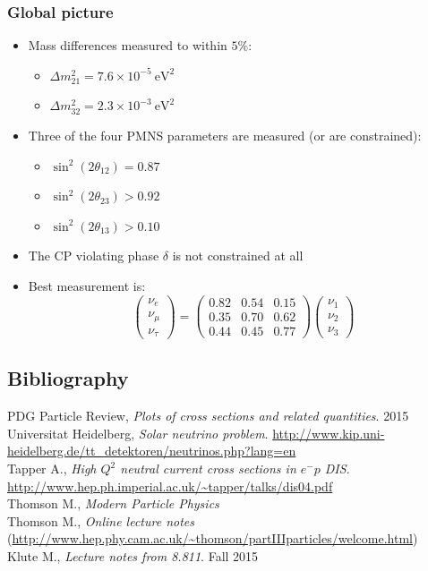 \documentclass[11pt]{article}
\newcommand{\ev}{\text{eV}}
\newcommand{\el}{\ensuremath{e^{-}}}
\newcommand{\bibspace}{\vspace{5mm}\\\noindent}
\begin{document}
\subsubsection{Global picture}
\begin{itemize}
  \item Mass differences measured to within $5\%$:
  \begin{itemize}
    \item $\Delta m_{21}^2 = 7.6 \times 10^{-5}~\ev^2$
    \item $\Delta m_{32}^2 = 2.3 \times 10^{-3}~\ev^2$
  \end{itemize}
  \item Three of the four PMNS parameters are measured (or are constrained):
  \begin{itemize}
    \item $\sin^2(2\theta_{12}) = 0.87$
    \item $\sin^2(2\theta_{23}) > 0.92$
    \item $\sin^2(2\theta_{13}) > 0.10$
  \end{itemize}
  \item The CP violating phase $\delta$ is not constrained at all
  \item Best measurement is:
  \begin{equation}
    \begin{pmatrix} \nu_e \\ \nu_\mu \\ \nu_\tau \end{pmatrix} = \begin{pmatrix} 0.82 & 0.54 & 0.15 \\ 0.35 & 0.70 & 0.62 \\ 0.44 & 0.45 & 0.77 \end{pmatrix}\begin{pmatrix} \nu_1 \\ \nu_2 \\ \nu_3 \end{pmatrix}
  \end{equation}
\end{itemize}


\begin{appendices}
\section{Bibliography}

\noindent PDG Particle Review, \emph{Plots of cross sections and related quantities}. 2015
\bibspace Universitat Heidelberg, \emph{Solar neutrino problem}. \url{http://www.kip.uni-heidelberg.de/tt_detektoren/neutrinos.php?lang=en}
\bibspace Tapper A., \emph{High $Q^2$ neutral current cross sections in $\el p$ DIS}. \url{http://www.hep.ph.imperial.ac.uk/~tapper/talks/dis04.pdf}
\bibspace Thomson M., \emph{Modern Particle Physics}
\bibspace Thomson M., \emph{Online lecture notes} (\url{http://www.hep.phy.cam.ac.uk/~thomson/partIIIparticles/welcome.html})
\bibspace Klute M., \emph{Lecture notes from 8.811}. Fall 2015

\end{appendices}
\end{document}
